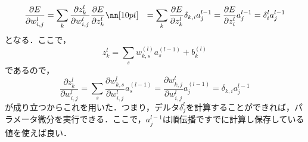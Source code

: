 \begin{align}
    \frac{\partial E}{\partial w^{l}_{i,j}}
    &=\sum_{k}\frac{\partial z^{l}_k}{\partial w^{l}_{i,j}}
    \frac{\partial E}{\partial z^{l}_{k}}\nn[10pt]
    &=\sum_{k}\frac{\partial E}{\partial z^{l}_{k}}
    \delta_{k,i} a^{l-1}_{j}
    =\frac{\partial E}{\partial z^{l}_{i}} a^{l-1}_{j}
    =\delta^{l}_{i}a^{l-1}_{j}
\end{align}
となる．ここで，
\begin{equation}
    z^{l}_{k} = \sum_{s}w^{(l)}_{k,s} a^{(l-1)}_{s} + b^{(l)}_{k}
\end{equation}
であるので，
\begin{equation}
    \frac{\partial z^{l}_k}{\partial w^{l}_{i,j}}
    = \sum_{s}\frac{\partial w^{l}_{k,s}}{\partial w^{l}_{i,j}}
    a^{(l-1)}_{s}
    =\frac{\partial w^{l}_{k,j}}{\partial w^{l}_{i,j}}
    a^{(l-1)}_{j}
    =\delta_{k,i}a^{l-1}_{j}
\end{equation}
が成り立つからこれを用いた．つまり，デルタ$\delta^{l}_{j}$を計算することができれば，パラメータ微分を実行できる．ここで，$a^{l-1}_{j}$は順伝播ですでに計算し保存している値を使えば良い．


